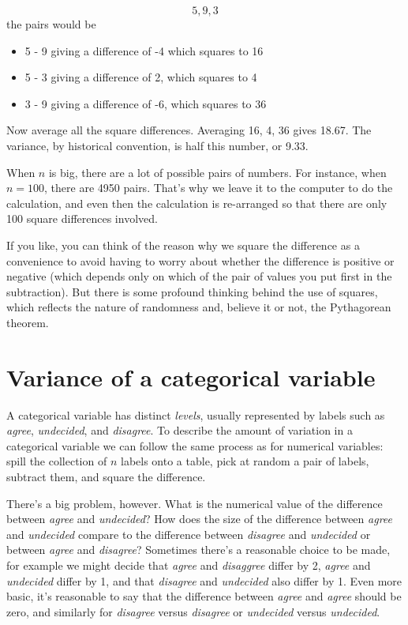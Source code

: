 \documentclass[]{tufte-book}
\providecommand{\tightlist}{%
  \setlength{\itemsep}{0pt}\setlength{\parskip}{0pt}}
\begin{document}
\[5, 9,  3\]
the pairs would be

\begin{itemize}
\tightlist
\item
  5 - 9 giving a difference of -4 which squares to 16
\item
  5 - 3 giving a difference of 2, which squares to 4
\item
  3 - 9 giving a difference of -6, which squares to 36
\end{itemize}

Now average all the square differences. Averaging 16, 4, 36 gives 18.67. The variance, by historical convention, is half this number, or 9.33.

When \(n\) is big, there are a lot of possible pairs of numbers. For instance, when \(n = 100\), there are 4950 pairs. That's why we leave it to the computer to do the calculation, and even then the calculation is re-arranged so that there are only 100 square differences involved.

If you like, you can think of the reason why we square the difference as a convenience to avoid having to worry about whether the difference is positive or negative (which depends only on which of the pair of values you put first in the subtraction). But there is some profound thinking behind the use of squares, which reflects the nature of randomness and, believe it or not, the Pythagorean theorem.

\hypertarget{variance-of-a-categorical-variable}{%
\section{Variance of a categorical variable}\label{variance-of-a-categorical-variable}}

A categorical variable has distinct \emph{levels}, usually represented by labels such as \emph{agree}, \emph{undecided}, and \emph{disagree}. To describe the amount of variation in a categorical variable we can follow the same process as for numerical variables: spill the collection of \(n\) labels onto a table, pick at random a pair of labels, subtract them, and square the difference.

There's a big problem, however. What is the numerical value of the difference between \emph{agree} and \emph{undecided}? How does the size of the difference between \emph{agree} and \emph{undecided} compare to the difference between \emph{disagree} and \emph{undecided} or between \emph{agree} and \emph{disagree}? Sometimes there's a reasonable choice to be made, for example we might decide that \emph{agree} and \emph{disaggree} differ by 2, \emph{agree} and \emph{undecided} differ by 1, and that \emph{disagree} and \emph{undecided} also differ by 1. Even more basic, it's reasonable to say that the difference between \emph{agree} and \emph{agree} should be zero, and similarly for \emph{disagree} versus \emph{disagree} or \emph{undecided} versus \emph{undecided}.
\end{document}
